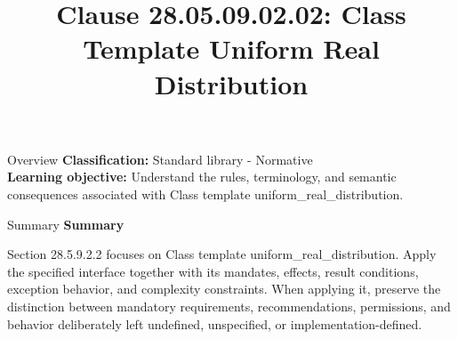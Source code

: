 \documentclass[10pt,letterpaper]{article}
\title{Clause 28.05.09.02.02: Class Template Uniform Real Distribution}
\author{}
\date{}
\begin{document}
\maketitle
\begin{CornellOverviewBox}{Overview}
\textbf{Classification:} Standard library - Normative\\[2pt]
\textbf{Learning objective:} Understand the rules, terminology, and semantic consequences associated with Class template uniform\_real\_distribution.
\end{CornellOverviewBox}\begin{CornellSummaryBox}{Summary}
{\sffamily\bfseries\color{Accent} Summary}\par\vspace{3pt}Section 28.5.9.2.2 focuses on Class template uniform\_real\_distribution. Apply the specified interface together with its mandates, effects, result conditions, exception behavior, and complexity constraints. When applying it, preserve the distinction between mandatory requirements, recommendations, permissions, and behavior deliberately left undefined, unspecified, or implementation-defined.
\end{CornellSummaryBox}
\end{document}
